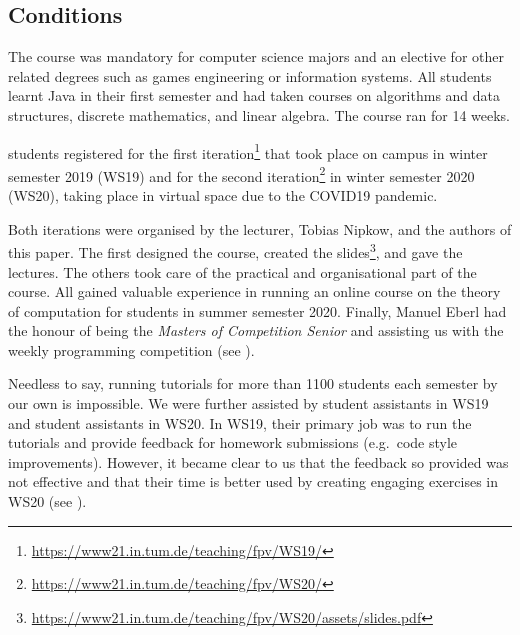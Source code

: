 \subsection{Conditions}

The course was mandatory for computer science majors and
an elective for other related degrees such as games engineering or information systems.
All students learnt Java in their first semester and had taken courses on algorithms and data structures,
discrete mathematics, and linear algebra.
The course ran for 14 weeks.

 students registered for
the first iteration\footnote{\url{https://www21.in.tum.de/teaching/fpv/WS19/}} that took place on campus in winter semester 2019 (WS19) and
 for the second iteration\footnote{\url{https://www21.in.tum.de/teaching/fpv/WS20/}} in winter semester 2020 (WS20), taking place in virtual space due to the COVID19 pandemic.

Both iterations were organised by the lecturer, Tobias Nipkow, and the authors of this paper.
The first designed the course, created the slides\footnote{\url{https://www21.in.tum.de/teaching/fpv/WS20/assets/slides.pdf}}, and gave the lectures.
The others took care of the practical and organisational part of the course.
All gained valuable experience in running an online course on the theory of computation for 
students in summer semester 2020.
Finally, Manuel Eberl had the honour of being the \emph{Masters of Competition Senior} and assisting us with the weekly programming competition (see ).

Needless to say,
running tutorials for more than 1100
students each semester by our own is impossible.
We were further assisted by
 student assistants in WS19 and
 student assistants in WS20.
In WS19, their primary job was to run the tutorials and provide feedback for homework submissions (e.g.\ code style improvements).
However, it became clear to us
that the feedback so provided was not effective
and that their time is better used by creating engaging exercises in WS20 (see ).



